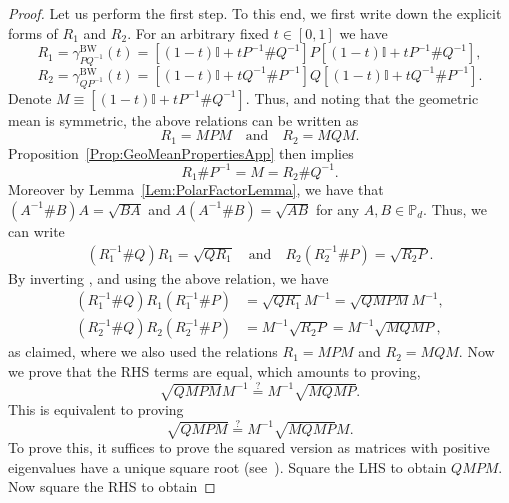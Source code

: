 \documentclass[12pt]{article}
\theoremstyle{definition}
\newcommand{\iseq}{\overset{?}{=}}
\begin{document}
\begin{proof}
Let us perform the first step. To this end, we first write down the explicit forms of $R_1$ and $R_2$. For an arbitrary fixed $t \in [0,1]$ we have
\begin{equation}
R_1 = \gamma_{P Q^{-1}}^{\mathrm{BW}}(t) = \left[(1-t)\mathbb{I} + t P^{-1} \# Q^{-1}\right] P \left[(1-t)\mathbb{I} + t P^{-1} \# Q^{-1}\right],
\end{equation}
\begin{equation}
R_2 = \gamma_{Q P^{-1}}^{\mathrm{BW}}(t) = \left[(1-t)\mathbb{I} + t Q^{-1} \# P^{-1}\right] Q \left[(1-t)\mathbb{I} + t Q^{-1} \# P^{-1}\right].
\end{equation}
Denote $M \equiv \left[(1-t)\mathbb{I} + t P^{-1} \# Q^{-1}\right]$. Thus, and noting that the geometric mean is symmetric, the above relations can be written as
\begin{equation}
R_1 = M P M \quad \text{and} \quad R_2 = M Q M.
\end{equation}
Proposition~\ref{Prop:GeoMeanPropertiesApp} then implies
\begin{equation}
R_1 \# P^{-1} = M = R_2 \# Q^{-1}.  \label{Eq:50}
 \end{equation}
Moreover by Lemma~\ref{Lem:PolarFactorLemma}, we have that $(A^{-1} \# B)A = \sqrt{BA}$ and $A (A^{-1} \# B)= \sqrt{A B}$ for any $A, B \in \mathbb P_d$. Thus, we can write
\begin{align}
(R_1^{-1} \# Q) R_1 = \sqrt{Q R_1} \quad \text{and} \quad R_2 (R_2 ^{-1} \# P) = \sqrt{R_2 P}.
\end{align}
By inverting , and using the above relation, we have
\begin{align}
    (R_1^{-1} \# Q)  R_1 (R_1^{-1} \# P) &= \sqrt{Q R_1} M ^{-1}  = \sqrt{Q M P M} M ^{-1}, \\
    (R_2^{-1} \# Q)  R_2 (R_2^{-1} \# P) &= M^{-1} \sqrt{R_2 P} = M ^{-1} \sqrt{M Q M P},
\end{align}
as claimed, where we also used the relations $R_1 = M P M$ and $R_2 = M Q M$. Now we prove that the RHS terms are equal, which amounts to proving,
\begin{equation}
    \sqrt{Q M P M} M ^{-1} \iseq M ^{-1} \sqrt{M Q M P}.
\end{equation}
This is equivalent to proving
\begin{equation}
\sqrt{Q M P M} \iseq M^{-1} \sqrt{M Q M P} M.
\end{equation}
To prove this, it suffices to prove the squared version as matrices with positive eigenvalues have a unique square root (see~\cite[Excercise 4.5.2]{bhatiamatrixanalysis}). Square the LHS to obtain $Q M P M$. Now square the RHS to obtain

\end{proof}
\end{document}
